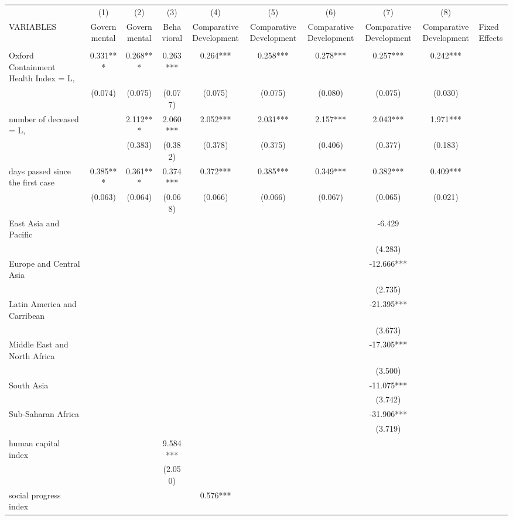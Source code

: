 \documentclass[]{article}
\begin{document}
\begin{tabular}{lcccccccc} \hline
 & (1) & (2) & (3) & (4) & (5) & (6) & (7) & (8) \\
VARIABLES & Governmental & Governmental & Behavioral & Comparative Development & Comparative Development & Comparative Development & Comparative Development & Comparative Development & Fixed Effects \\ \hline
 &  &  &  &  &  &  &  &  \\
Oxford Containment Health Index = L, & 0.331*** & 0.268*** & 0.263*** & 0.264*** & 0.258*** & 0.278*** & 0.257*** & 0.242*** \\
 & (0.074) & (0.075) & (0.077) & (0.075) & (0.075) & (0.080) & (0.075) & (0.030) \\
number of deceased = L, &  & 2.112*** & 2.060*** & 2.052*** & 2.031*** & 2.157*** & 2.043*** & 1.971*** \\
 &  & (0.383) & (0.382) & (0.378) & (0.375) & (0.406) & (0.377) & (0.183) \\
days passed since the first case & 0.385*** & 0.361*** & 0.374*** & 0.372*** & 0.385*** & 0.349*** & 0.382*** & 0.409*** \\
 & (0.063) & (0.064) & (0.068) & (0.066) & (0.066) & (0.067) & (0.065) & (0.021) \\
East Asia and Pacific &  &  &  &  &  &  & -6.429 &  \\
 &  &  &  &  &  &  & (4.283) &  \\
Europe and Central Asia &  &  &  &  &  &  & -12.666*** &  \\
 &  &  &  &  &  &  & (2.735) &  \\
Latin America and Carribean &  &  &  &  &  &  & -21.395*** &  \\
 &  &  &  &  &  &  & (3.673) &  \\
Middle East and North Africa &  &  &  &  &  &  & -17.305*** &  \\
 &  &  &  &  &  &  & (3.500) &  \\
South Asia &  &  &  &  &  &  & -11.075*** &  \\
 &  &  &  &  &  &  & (3.742) &  \\
Sub-Saharan Africa &  &  &  &  &  &  & -31.906*** &  \\
 &  &  &  &  &  &  & (3.719) &  \\
human capital index &  &  & 9.584*** &  &  &  &  &  \\
 &  &  & (2.050) &  &  &  &  &  \\
social progress index &  &  &  & 0.576*** &  &  &  &  \\

\end{tabular}
\end{document}
